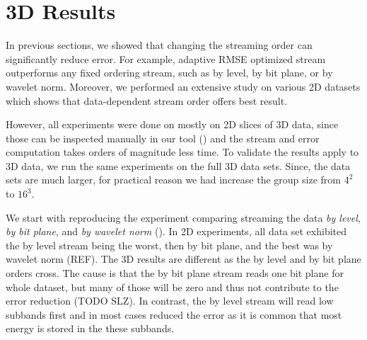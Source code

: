 \section{3D Results}
In previous sections, we showed that changing the streaming order can significantly reduce error. For example,
adaptive RMSE optimized stream outperforms any fixed ordering stream, such as by level,
by bit plane, or by wavelet norm. Moreover, we performed an extensive study on various 2D datasets which shows that
data-dependent stream order offers best result.

However, all experiments were done on mostly on 2D slices of 3D data, since those can be inspected manually in our
tool () and the stream and error computation takes orders of magnitude less time. To validate the results
apply to 3D data, we run the same experiments on the full 3D data sets. Since, the data sets are much larger, for
practical reason we had increase the group size from $4^2$ to $16^3$.

We start with reproducing the experiment comparing streaming the data \emph{by level}, \emph{by bit plane},
and \emph{by wavelet norm} (). In 2D experiments, all data set exhibited the by level stream
being the worst, then by bit plane, and the best was by wavelet norm (REF). The 3D results are different as
the by level and by bit plane orders cross. The cause is that the by bit plane stream reads one bit plane for whole
dataset, but many of those will be zero and thus not contribute to the error reduction (TODO SLZ). In contrast, the by
level stream will read low subbands first and in most cases reduced the error as it is common that most energy is stored in
the these subbands.

